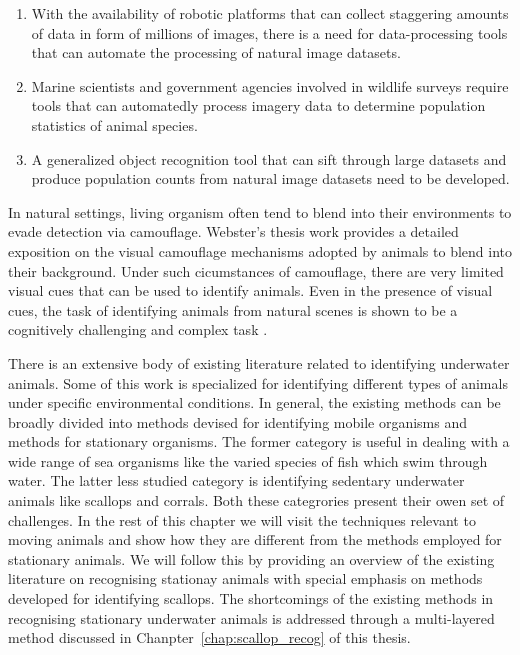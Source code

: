 \documentclass {udthesis}
\begin{document}
\begin{enumerate}[label=Section \arabic*:, start=0]
  \begin{enumerate} [label=Para \arabic*:, start=1]
   
   \item With the availability of robotic platforms that can collect staggering amounts of data in form of millions of images, there is a need for data-processing tools that can automate the processing of natural image datasets.
   
   \item Marine scientists and government agencies involved in wildlife surveys require tools that can automatedly process imagery data to determine population statistics of animal species.
   
   \item A generalized object recognition tool that can sift through large datasets and produce population counts from natural image datasets need to be developed.
   
  \end{enumerate}

\end{enumerate}


In natural settings, living organism often tend to blend into their environments to evade detection via camouflage. Webster's thesis work \cite{webster} provides a detailed exposition on the visual camouflage mechanisms adopted by animals to blend into their background. Under such cicumstances of camouflage, there are very limited visual cues that can be used to identify animals. Even in the presence of visual cues, the task of identifying animals from natural scenes is shown to be a cognitively challenging and complex task \cite{wichmann}.

There is an extensive body of existing literature related to identifying underwater animals. Some of this work is specialized for identifying different types of animals under specific environmental conditions. In general, the existing methods can be broadly divided into methods devised for identifying mobile organisms and methods for stationary organisms. The former category is useful in dealing with a wide range of sea organisms like the varied species of fish which swim through water. The latter less studied category is identifying sedentary underwater animals like scallops and corrals. Both these categrories present their owen set of challenges. In the rest of this chapter we will visit the techniques relevant to moving animals and show how they are different from the methods employed for stationary animals. We will follow this by providing an overview of the existing literature on recognising stationay animals with special emphasis on methods developed for identifying scallops. The shortcomings of the existing methods in recognising stationary underwater animals is addressed through a multi-layered method discussed in Chanpter~\ref{chap:scallop_recog} of this thesis.
\end{document}
